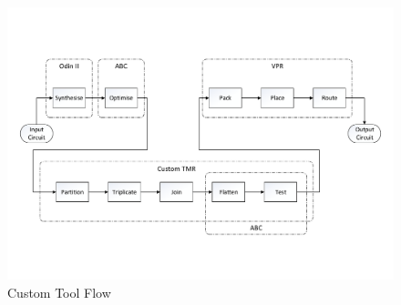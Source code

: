 \documentclass[12pt,final,oneside]{dwThesis} %
\begin{document}
   \begin{figure} \begin{center}
         \includegraphics[width=\linewidth]{images/CadFlowWPartitioner.pdf}
         \caption{Custom Tool Flow} \label{algToolflow} \end{center}
   \end{figure}
   
\end{document}
